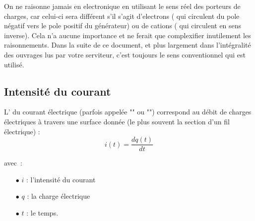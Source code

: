 On ne raisonne jamais en electronique en utilisant le sens réel des porteurs de charges, car celui-ci sera différent s'il s'agit d'electrons ( qui circulent du pole négatif vers le pole positif du générateur) ou de cations ( qui circulent en sens inverse). Cela n'a aucune importance et ne ferait que complexifier inutilement les raisonnements. Dans la suite de ce document, et plus largement dans l'intégralité des ouvrages lus par votre serviteur, c'est toujours le sens conventionnel qui est utilisé.

\subsection*{Intensité du courant}

L' du courant électrique (parfois appelée "" ou "") correspond au débit de charges électriques à travers une surface donnée (le plus souvent la section d'un fil électrique) : \\

\begin{equation}
	i(t) = \dfrac{dq(t)}{dt} 
\end{equation}

avec~: \\
\begin{itemize}
	\item[$\bullet$] $i$ : l'intensité du courant
	\item[$\bullet$] $q$ : la charge électrique
	\item[$\bullet$] $t$ : le temps.
\end{itemize}


